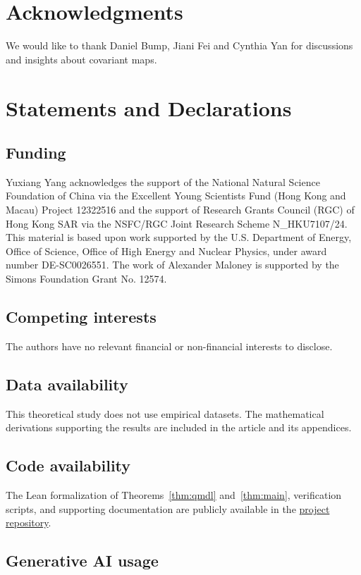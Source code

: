 \documentclass[a4paper,onecolumn,11pt]{quantumarticle}
\begin{document}
\section*{Acknowledgments}
    We would like to thank Daniel Bump, Jiani Fei and Cynthia Yan for discussions and insights about covariant maps.

\section*{Statements and Declarations}

\subsection*{Funding}
Yuxiang Yang acknowledges the support of the National Natural Science Foundation of China via the Excellent Young Scientists Fund (Hong Kong and Macau) Project 12322516 and the support of Research Grants Council (RGC) of Hong Kong SAR via the NSFC/RGC Joint Research Scheme N\_HKU7107/24. This material is based upon work supported by the U.S. Department of Energy, Office of Science, Office of High Energy and Nuclear Physics, under award number DE-SC0026551. The work of Alexander Maloney is supported by the Simons Foundation Grant No. 12574.

\subsection*{Competing interests}
The authors have no relevant financial or non-financial interests to disclose.

\subsection*{Data availability}
This theoretical study does not use empirical datasets. The mathematical
derivations supporting the results are included in the article and its
appendices.

\subsection*{Code availability}
The Lean formalization of
Theorems~\ref{thm:qmdl} and~\ref{thm:main}, verification scripts, and
supporting documentation are publicly available in the
\href{https://github.com/JWang226/Quantum-Minimum-Description-Length}{project repository}.

\subsection*{Generative AI usage}
\end{document}
